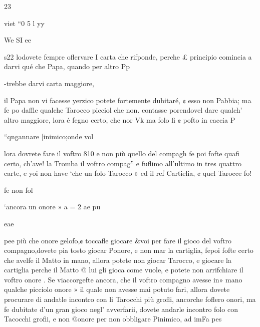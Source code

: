 \documentclass[11pt,a6paper]{article}
\begin{document}
   

23

  
      
  

 
 

 

 

 

 

viet
“0 5 l
yy

 

 

 

We SI ee

s22
lodovete fempre oflervare I
carta che rifponde, perche £
principio comincia a darvi qué
che Papa, quando per altro Pp

-trebbe darvi carta maggiore,

il Papa non vi facesse yerzico
potete fortemente dubitaré, ¢
esso non Pabbia; ma fe po%
daffle qualche Tarocco picciol
che non. contasse porendovel
dare qualch’ altro maggiore,
lora é fegno certo, che nor Vk
ma folo fi ¢ pofto in caccia P

“qngannare [inimico;onde vol

lora dovrete fare il voftro 810
e non più quello del compagh
fe poi fofte quafi certo, ch’ave!
la Tromba il voftro compag”
e fuflimo all’ultimo in tres
quattro carte, e yoi non have
‘che un folo Tarocco » ed il ref
Cartielia, ¢ quel Tarocce fo!

fe non fol

‘ancora un onore » a
= 2 ae pu

eae
  
  

pee
più che onore gelofo,¢ toccafle
giocare &voi per fare il gioco
del voftro compagno,dovete pia
tosto giocar Ponore, e non mar
la cartiglia, fepoi fofte certo
che avelfe il Matto in mano, allora potete non giocar Tarocco,
e giocare la cartiglia perche
il Matto @ lui gli gioca come
vuole, e potete non arrifchiare
il voftro onore .
Se viaccorgefte ancora, che
il voftro compagno avesse in»
mano qualche picciolo onore »
il quale non avesse mai potuto
fari, allora dovete procurare di
andatle incontro con li Tarocchi più grofli, ancorche foflero
onori, ma fe dubitate d'un gran
gioco negl’ avverfarii, dovete
andarle incontro folo con Tacocchi grofii, e non @onore per
non obbligare Pinimico, ad imFa pes

 

 

 
 

 
\end{document}
